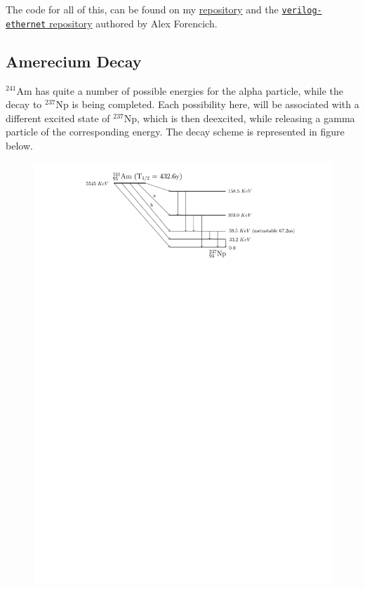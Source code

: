 \documentclass{double}
\begin{document}
\begin{multicols*}{2}
The code for all of this, can be found on my
\href{https://github.com/surelynottrue/coincidence}{repository} and the \href{https://github.com/alexforencich/verilog-ethernet/}{\texttt{verilog-ethernet} repository} authored by Alex Forencich.

\subsection{Amerecium Decay}
$^{241}$Am has quite a number of possible energies for the
alpha particle, while the decay to $^{237}$Np is being
completed. Each possibility here, will be associated with a
different excited state of $^{237}$Np, which is then
deexcited, while releasing a gamma particle of the
corresponding energy. The decay scheme is represented in
figure below.
\begin{figure}[H]
	\centering
	\includegraphics[width=\columnwidth]{images/decay.pdf}

\end{figure}
\end{multicols*}
\end{document}
